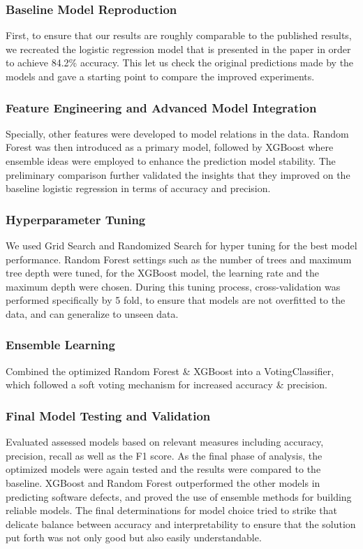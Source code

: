 \documentclass[conference]{IEEEtran}
\begin{document}
\subsubsection{Baseline Model Reproduction}
First, to ensure that our results are roughly comparable to the published results, we recreated the logistic regression model that is presented in the paper in order to achieve 84.2\% accuracy. This let us check the original predictions made by the models and gave a starting point to compare the improved experiments.
 
\subsubsection{Feature Engineering and Advanced Model Integration}
Specially, other features were developed to model relations in the data. Random Forest was then introduced as a primary model, followed by XGBoost where ensemble ideas were employed to enhance the prediction model stability. The preliminary comparison further validated the insights that they improved on the baseline logistic regression in terms of accuracy and precision.

\subsubsection{Hyperparameter Tuning}
We used Grid Search and Randomized Search for hyper tuning for the best model performance. Random Forest settings such as the number of trees and maximum tree depth were tuned, for the XGBoost model, the learning rate and the maximum depth were chosen. During this tuning process, cross-validation was performed specifically by 5 fold, to ensure that models are not overfitted to the data, and can generalize to unseen data.

\subsubsection{Ensemble Learning}
Combined the optimized Random Forest \& XGBoost into a VotingClassifier, which followed a soft voting mechanism for increased accuracy \& precision.

\subsubsection{Final Model Testing and Validation}
Evaluated assessed models based on relevant measures including accuracy, precision, recall as well as the F1 score. As the final phase of analysis, the optimized models were again tested and the results were compared to the baseline. XGBoost and Random Forest outperformed the other models in predicting software defects, and proved the use of ensemble methods for building reliable models. The final determinations for model choice tried to strike that delicate balance between accuracy and interpretability to ensure that the solution put forth was not only good but also easily understandable.
\end{document}
